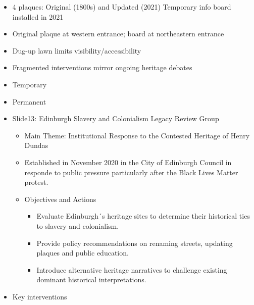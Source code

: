 \documentclass{scrartcl}
\begin{document}
\begin{itemize}
\begin{itemize}
            \begin{itemize}
                \item 4 plaques: Original (1800s) and Updated (2021) Temporary info board installed in 2021
            \end{itemize}
                \begin{itemize}
                    \item Original plaque at western entrance; board at northeastern entrance
                    \item Dug-up lawn limits visibility/accessibility
                    \item Fragmented interventions mirror ongoing heritage debates
                \end{itemize}            
        \end{itemize}
        \begin{itemize}
            \item Temporary
            \item Permanent
        \end{itemize}
    \end{itemize}
    \begin{itemize}
        \item Slide13: Edinburgh Slavery and Colonialism Legacy Review Group        
        \begin{itemize}
            \item Main Theme: Institutional Response to the Contested Heritage of Henry Dundas
            \item Established in November 2020 in the City of Edinburgh Council in responde to public pressure particularly after the Black Lives Matter protest.
        \end{itemize}    
        \begin{itemize}
        \item Objectives and Actions                    
                \begin{itemize}
                        \item Evaluate Edinburgh´s heritage sites to determine their historical ties to slavery  and colonialism.        
                        \item Provide policy recommendations on renaming streets, updating plaques and public education.
                        \item Introduce alternative heritage narratives to challenge existing dominant historical interpretations.
                    \end{itemize}
                \end{itemize}
                \item Key interventions
    \end{itemize}
\end{document}
